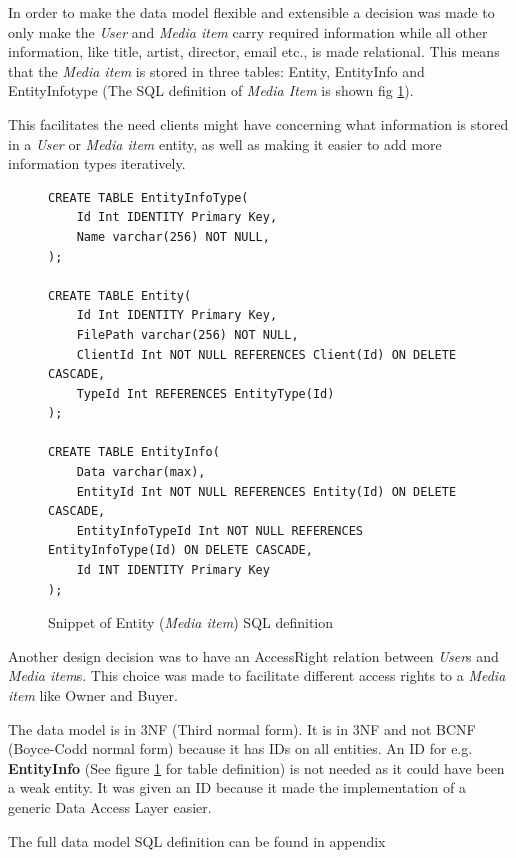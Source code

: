 \documentclass[../report.tex]{subfiles}
\begin{document}
In order to make the data model flexible and extensible a decision was made to only make the \textit{User} and \textit{Media item} carry required information while all other information, like title, artist, director, email etc., is made relational. This means that the \textit{Media item} is stored in three tables: Entity, EntityInfo and EntityInfotype (The SQL definition of \textit{Media Item} is shown fig \ref{datamodel}).

This facilitates the need clients might have concerning what information is stored in a \textit{User} or \textit{Media item} entity, as well as making it easier to add more information types iteratively.\\

\begin{figure}[H]
\begin{lstlisting}
CREATE TABLE EntityInfoType(
	Id Int IDENTITY Primary Key,
	Name varchar(256) NOT NULL,
);

CREATE TABLE Entity(
	Id Int IDENTITY Primary Key,
	FilePath varchar(256) NOT NULL,
	ClientId Int NOT NULL REFERENCES Client(Id) ON DELETE CASCADE,
	TypeId Int REFERENCES EntityType(Id)
);

CREATE TABLE EntityInfo(
	Data varchar(max),
	EntityId Int NOT NULL REFERENCES Entity(Id) ON DELETE CASCADE,
	EntityInfoTypeId Int NOT NULL REFERENCES EntityInfoType(Id) ON DELETE CASCADE,
	Id INT IDENTITY Primary Key
);
\end{lstlisting}
\caption{Snippet of Entity (\textit{Media item}) SQL definition}
\label{datamodel}
\end{figure}

Another design decision was to have an AccessRight relation between \textit{User}s and \textit{Media item}s. This choice was made to facilitate different access rights to a \textit{Media item} like Owner and Buyer.

The data model is in 3NF (Third normal form). It is in 3NF and not BCNF (Boyce-Codd normal form) because it has IDs on all entities. An ID for e.g. \textbf{EntityInfo} (See figure \ref{datamodel} for table definition) is not needed as it could have been a weak entity. It was given an ID because it made the implementation of a generic Data Access Layer easier.

The full data model SQL definition can be found in appendix

\end{document}
